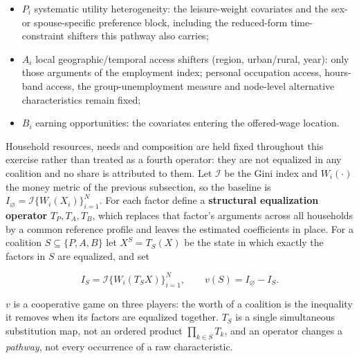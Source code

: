 \documentclass[11pt,a4paper]{article}
\providecommand{\tightlist}{\setlength{\itemsep}{0pt}\setlength{\parskip}{0pt}}
\begin{document}
\begin{itemize}
\tightlist
\item
  \(P_i\) systematic utility heterogeneity: the leisure-weight covariates and the sex- or spouse-specific preference block, including the reduced-form time-constraint shifters this pathway also carries;
\item
  \(A_i\) local geographic/temporal access shifters (region, urban/rural, year): only those arguments of the employment index; personal occupation access, hours-band access, the group-unemployment measure and node-level alternative characteristics remain fixed;
\item
  \(B_i\) earning opportunities: the covariates entering the offered-wage location.
\end{itemize}

Household resources, needs and composition are held fixed throughout this exercise rather than treated as a fourth operator: they are not equalized in any coalition and no share is attributed to them. Let \(\mathcal I\) be the Gini index and \(W_i(\cdot)\) the money metric of the previous subsection, so the baseline is \(I_\varnothing=\mathcal I\{W_i(X_i)\}_{i=1}^N\). For each factor define a \textbf{structural equalization operator} \(T_P,T_A,T_B\), which replaces that factor's arguments across all households by a common reference profile and leaves the estimated coefficients in place. For a coalition \(S\subseteq\{P,A,B\}\) let \(X^S=T_S(X)\) be the state in which exactly the factors in \(S\) are equalized, and set

\[
I_S=\mathcal I\{W_i(T_S X)\}_{i=1}^{N},
\qquad
v(S)=I_\varnothing-I_S .
\]

\(v\) is a cooperative game on three players: the worth of a coalition is the inequality it removes when its factors are equalized together. \(T_S\) is a single simultaneous substitution map, not an ordered product \(\prod_{k\in S}T_k\), and an operator changes a \emph{pathway}, not every occurrence of a raw characteristic.
\end{document}
